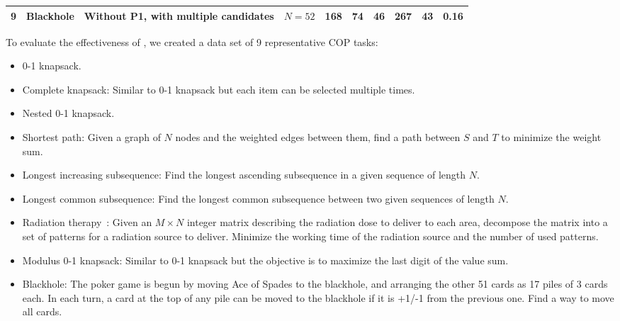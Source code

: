 \begin{table*}[htb]
\begin{tabular}{l|l|p{3cm}| r| r| r| r| r| r|r}
			
			
			9 & Blackhole & Without P1, with multiple candidates &$N=52$ &168& 74& 46 &267 & 43 & 0.16\\
			\bottomrule
		\end{tabular}
	
	\end{table*}

To evaluate the effectiveness of \tool, we created a data set of 9 representative COP tasks:  %
\begin{itemize}
    \item 0-1 knapsack.
    \item Complete knapsack: Similar to 0-1 knapsack but  each item can be selected multiple times. 
    \item Nested 0-1 knapsack.
    \item Shortest path: 
    Given a graph of $N$ nodes and the weighted edges between them, 
     find a path between $S$ and $T$ 
    to minimize the weight sum. 
    \item Longest increasing subsequence:
    Find the longest ascending subsequence in a given sequence of length $N$.  
    \item Longest common subsequence: Find the longest common subsequence between two given sequences of length $N$.
\item Radiation therapy~\cite{Baatar:2007}:
    Given an $M\times N$ integer matrix describing the radiation dose to deliver to each area, decompose the matrix into 
   a set of patterns for a radiation source to deliver. 
   Minimize the working time of the radiation source and the number of used patterns.
    \item Modulus 0-1 knapsack: Similar to 0-1 knapsack but the objective is to maximize the last digit of the value sum. 
    
    \item Blackhole: The poker game is begun by moving Ace of Spades to the blackhole,
    and arranging the other 51 cards as 17 piles of 3 cards each. 
    In each turn, a card at the top of any pile can be moved to the blackhole if it is +1/-1 from the previous one. Find a way to move all cards.
\end{itemize}

